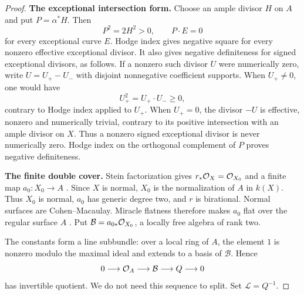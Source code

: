 \begin{proof}
\par\smallskip\noindent\textbf{The exceptional intersection form.}
Choose an ample divisor $H$ on $A$ and put $P=\alpha^*H$.
Then
\[
 P^2=2H^2>0,\qquad P\cdot E=0
\]
for every exceptional curve $E$.  Hodge index gives negative
square for every nonzero effective exceptional divisor.
It also gives negative definiteness for signed exceptional
divisors, as follows.  If a nonzero such divisor $U$ were
numerically zero, write $U=U_+-U_-$ with disjoint nonnegative
coefficient supports.  When $U_+\ne0$, one would have
\[
 U_+^2=U_+\cdot U_-\ge0,
\]
contrary to Hodge index applied to $U_+$.
When $U_+=0$, the divisor $-U$ is effective, nonzero and
numerically trivial, contrary to its positive intersection
with an ample divisor on $X$.  Thus a nonzero signed
exceptional divisor is never numerically zero.  Hodge index
on the orthogonal complement of $P$ proves negative definiteness.

\par\smallskip\noindent\textbf{The finite double cover.}
Stein factorization gives $r_*\mathcal O_X=\mathcal O_{X_0}$ and a finite
map $a_0:X_0\to A$
\cite[Theorem~37.53.4, Tag~03GX]{Stacks}.
Since $X$ is normal, $X_0$ is the normalization of $A$ in $k(X)$.
Thus $X_0$ is normal, $a_0$ has generic degree two, and $r$ is
birational.  Normal surfaces are Cohen--Macaulay.  Miracle
flatness therefore makes $a_0$ flat over the regular surface
$A$ \cite[Lemma~10.128.1, Tag~00R4]{Stacks}.
Put $\mathcal B=a_{0*}\mathcal O_{X_0}$, a locally free algebra of rank two.

The constants form a line subbundle: over a local ring of $A$,
the element $1$ is nonzero modulo the maximal ideal and extends
to a basis of $\mathcal B$.  Hence
\begin{equation}\label{eq:strict-canonical-cover-algebra}
 0\longrightarrow\mathcal O_A\longrightarrow\mathcal B
 \longrightarrow Q\longrightarrow0
\end{equation}
has invertible quotient.  We do not need this sequence to split.
Set $\mathcal L=Q^{-1}$.


\end{proof}
